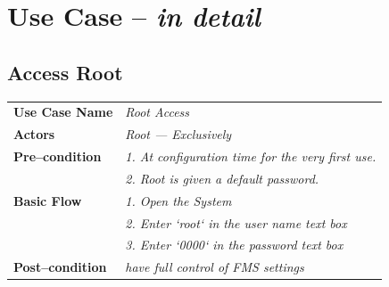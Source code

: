 \documentclass{article}
\begin{document}
\newpage
\section{Use Case -- \textit{in detail}}
\subsection{Access Root}
    \begin{tabular}{ l | l }
    \toprule
      \rowcolor{LightCyan}
      \textbf{Use Case Name}    & \textit{Root Access}\\
      \textbf{Actors}           & \textit{Root --- Exclusively}\\
      \rowcolor{LightCyan}
      \textbf{Pre--condition}   & \textit{1. At configuration time for the very first use.} \\
      \rowcolor{LightCyan}
                                & \textit{2. Root is given a default password.}\\
      \textbf{Basic Flow}       & \textit{1. Open the System}\\
                                & \textit{2. Enter `root` in the user name text box}\\
                                & \textit{3. Enter `0000` in the password text box}\\
      \rowcolor{LightCyan}
      \textbf{Post--condition}  & \textit{have full control of FMS settings}\\
    \toprule
    \end{tabular}
    \newpage
\end{document}
